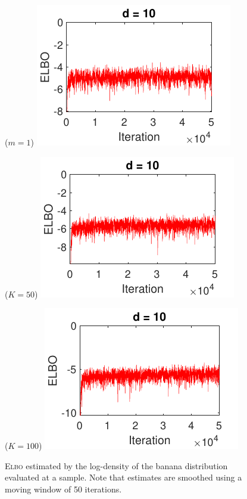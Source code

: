 \documentclass[10pt]{article}
\begin{document}
\begin{figure}[p!]
\centering
\begin{minipage}{0.32\textwidth}
\centering
\uivi ($m=1$)
\includegraphics[trim={0 0 0 11.5},clip]{images/bananaND_usivi_ELBO_movavg50_d10_m1.pdf}
\end{minipage}
\begin{minipage}{0.32\textwidth}
\centering
\sivi ($K=50$)
\includegraphics[trim={0 0 0 11.5},clip]{images/bananaND_sivi_ELBO_movavg50_d10_K50.pdf}
\end{minipage}
\begin{minipage}{0.32\textwidth}
\centering
\sivi ($K=100$)
\includegraphics[trim={0 0 0 11.5},clip]{images/bananaND_sivi_ELBO_movavg50_d10_K100.pdf}
\end{minipage}
\caption{\textsc{Elbo} estimated by the log-density of the banana distribution evaluated at a sample. Note that estimates are smoothed using a moving window of 50 iterations.}
\label{fig:sivielbo}
\end{figure}
\end{document}
